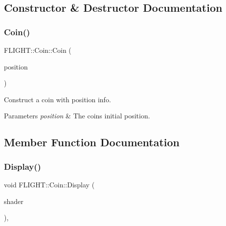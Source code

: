 \subsection{Constructor \& Destructor Documentation}
\mbox{\label{class_f_l_i_g_h_t_1_1_coin_aef06dda1135461e27bd83a48fa5c02ca}} 
\subsubsection{\texorpdfstring{Coin()}{Coin()}}
{\footnotesize\ttfamily F\+L\+I\+G\+H\+T\+::\+Coin\+::\+Coin (\begin{DoxyParamCaption}\item[{const glm\+::vec3 \&}]{position }\end{DoxyParamCaption})}



Construct a coin with position info. 


\begin{DoxyParams}{Parameters}
{\em position} & The coin\textquotesingle{}s initial position. \\
\hline
\end{DoxyParams}


\subsection{Member Function Documentation}
\mbox{\label{class_f_l_i_g_h_t_1_1_coin_a58efad82df5912b37de5084b9575c59d}} 
\subsubsection{\texorpdfstring{Display()}{Display()}}
{\footnotesize\ttfamily void F\+L\+I\+G\+H\+T\+::\+Coin\+::\+Display (\begin{DoxyParamCaption}\item[{\hyperlink{class_f_l_i_g_h_t_1_1_shader_program}{Shader\+Program} \&}]{shader }\end{DoxyParamCaption})\hspace{0.3cm}{\ttfamily [override]}, {\ttfamily [virtual]}}




